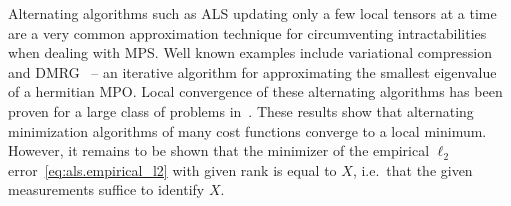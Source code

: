 Alternating algorithms such as ALS updating only a few local tensors at a time are a very common approximation technique for circumventing intractabilities when dealing with MPS.
Well known examples include variational compression and DMRG~\cite{Schollwoeck_2011_DensityMatrix} --  an iterative algorithm for approximating the smallest eigenvalue of a hermitian MPO.
Local convergence of these alternating algorithms has been proven for a large class of problems in~\cite{Holtz_2012_Alternating,Rohwedder_2013_On}.
These results show that alternating minimization algorithms of many cost functions converge to a local minimum.
However, it remains to be shown that the minimizer of the empirical $\ell_2$ error~\eqref{eq:als.empirical_l2} with given rank is equal to $X$, i.e.\ that the given measurements suffice to identify $X$.

